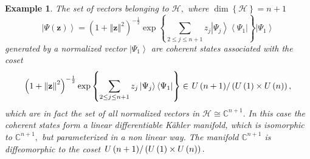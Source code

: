 \documentclass[aps,preprint]{revtex4}%
\newtheorem{example}[theorem]{Example}
\begin{document}
\begin{example}
The set of vectors belonging to $\mathcal{H},$ where $\dim\left\{
\mathcal{H}\right\}  =n+1$
\begin{equation}
\left\vert \Psi\left(  \mathbf{z}\right)  \right\rangle =\left(  1+\left\Vert
\mathbf{z}\right\Vert ^{2}\right)  ^{-\frac{1}{2}}\exp\left\{  \sum_{2\leq
j\leq n+1}z_{j}\left\vert \Psi_{j}\right\rangle \left\langle \Psi
_{1}\right\vert \right\}  \left\vert \Psi_{1}\right\rangle
\end{equation}
generated by a normalized vector $\left\vert \Psi_{1}\right\rangle $ are
coherent states associated with the coset
\begin{equation}
\left(  1+\left\Vert \mathbf{z}\right\Vert ^{2}\right)  ^{-\frac{1}{2}}%
\exp\left\{  \sum_{2\leq j\leq n+1}z_{j}\left\vert \Psi_{j}\right\rangle
\left\langle \Psi_{1}\right\vert \right\}  \in\left.  U\left(  n+1\right)
\right/  \left(  U\left(  1\right)  \times U\left(  n\right)  \right)  ,
\end{equation}
which are in fact the set of all normalized vectors in $\mathcal{H\cong%
}\mathbb{C}^{n+1}.$ In this case the coherent states form a \emph{linear
differentiable K\"{a}hler manifold,} which is isomorphic to $\mathbb{C}%
^{n+1},$ but parameterized in a non linear way. The manifold $\mathbb{C}%
^{n+1}$ is diffeomorphic to the coset $\left.  U\left(  n+1\right)  \right/
\left(  U\left(  1\right)  \times U\left(  n\right)  \right)  .$


\end{example}
\end{document}

